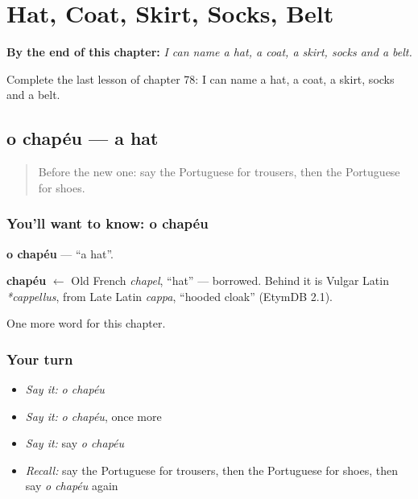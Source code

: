 
\chapter{Hat, Coat, Skirt, Socks, Belt}
\label{ch:pt-hat-coat-skirt-socks-belt}

\begin{chapteropening}
\textbf{By the end of this chapter:} \emph{I can name a hat, a coat, a skirt, socks and a belt.}

Complete the last lesson of chapter 78: I can name a hat, a coat, a skirt, socks and a belt.
\end{chapteropening}

\section[o chapéu]{o chapéu — a hat}

\label{lesson:PT-C78-chapeu}



\begin{quote}
Before the new one: say the Portuguese for trousers, then the Portuguese for shoes.
\end{quote}

\subsection*{You'll want to know: o chapéu}
\textbf{o chapéu} — \textquotedblleft{}a hat\textquotedblright{}.

\begin{cousinweb}
\textbf{chapéu} $\leftarrow$ Old French \emph{chapel}, \textquotedblleft{}hat\textquotedblright{} — borrowed. Behind it is Vulgar Latin \emph{*cappellus}, from Late Latin \emph{cappa}, \textquotedblleft{}hooded cloak\textquotedblright{} (EtymDB 2.1).
\end{cousinweb}

\begin{grammarlens}[title={What you've built}]
One more word for this chapter.
\end{grammarlens}

\subsection*{Your turn}
\begin{itemize}
\raggedright
  \item \emph{Say it:} \emph{o chapéu}
  \item \emph{Say it:} \emph{o chapéu}, once more
  \item \emph{Say it:} say \emph{o chapéu}
  \item \emph{Recall:} say the Portuguese for trousers, then the Portuguese for shoes, then say \emph{o chapéu} again
\end{itemize}

